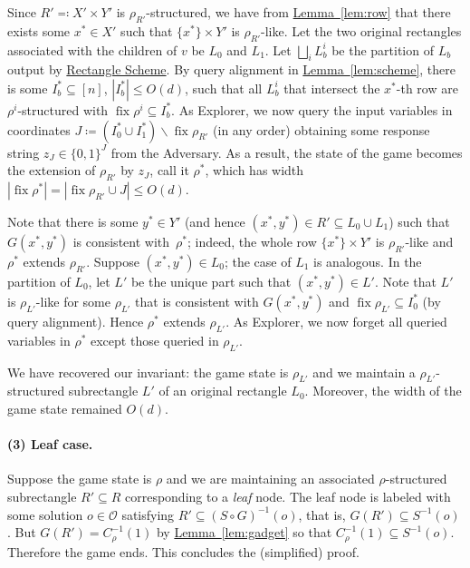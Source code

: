 \documentclass[11pt]{article}
\numberwithin{equation}{section}
\theoremstyle{definition}
\theoremstyle{plain}
\newcommand{\expref}[2]{\hyperref[#2]{#1~\ref{#2}}}
\newcommand{\rectlemma}{\expref{Lemma}{lem:scheme}\xspace}%
\newcommand{\rectscheme}{\hyperref[alg:partition]{Rectangle Scheme}\xspace}
\DeclareMathOperator{\fix}{fix}
\newcommand{\calO}{\mathcal{O}}
\begin{document}
Since $R' \eqqcolon X' \times Y'$ is $\rho_{R'}$-structured, we have from \expref{Lemma}{lem:row} that there exists some $x^*\in X'$ such that $\{x^*\}\times Y'$ is $\rho_{R'}$-like. Let the two original rectangles associated with the children of $v$ be $L_0$ and $L_1$. Let $\bigsqcup_i L_b^i$ be the partition of $L_b$ output by \rectscheme. By query alignment in \rectlemma, there is some $I_b^*\subseteq [n]$, $|I_b^*|\leq O(d)$, such that all $L_b^i$ that intersect the $x^*$-th row are $\rho^i$-structured with $\fix\rho^i\subseteq I_b^*$. As Explorer, we now query the input variables in coordinates $J\coloneqq (I_0^* \cup I_1^*) \smallsetminus \fix\rho_{R'}$ (in any order) obtaining some response string $z_J\in\{0,1\}^J$ from the Adversary. As a result, the state of the game becomes the extension of $\rho_{R'}$ by $z_J$, call it $\rho^*$, which has width $|\!\fix\rho^*|=|\!\fix\rho_{R'}\cup J|\leq O(d)$.

Note that there is some $y^*\in Y'$ (and hence $(x^*, y^*) \in R'\subseteq L_0\cup L_1$) such that $G(x^*,y^*)$ is consistent with~$\rho^*$; indeed, the whole row $\{x^*\}\times Y'$ is $\rho_{R'}$-like and $\rho^*$ extends $\rho_{R'}$. Suppose $(x^*, y^*) \in L_0$; the case of $L_1$ is analogous. In the partition of $L_0$, let $L'$ be the unique part such that $(x^*,y^*)\in L'$. Note that $L'$ is $\rho_{L'}$-like for some $\rho_{L'}$ that is consistent with $G(x^*,y^*)$ and $\fix\rho_{L'}\subseteq I_0^*$ (by query alignment). Hence $\rho^*$ extends $\rho_{L'}$. As Explorer, we now forget all queried variables in $\rho^*$ except those queried in $\rho_{L'}$.

We have recovered our invariant: the game state is $\rho_{L'}$ and we maintain a $\rho_{L'}$-structured subrectangle $L'$ of an original rectangle $L_0$. Moreover, the width of the game state remained $O(d)$.

\paragraph{(3) Leaf case.}
Suppose the game state is $\rho$ and we are maintaining an associated $\rho$-structured subrectangle $R'\subseteq R$ corresponding to a \emph{leaf} node. The leaf node is labeled with some solution $o\in \calO$ satisfying $R'\subseteq (S\circ G)^{-1}(o)$, that is, $G(R')\subseteq S^{-1}(o)$. But $G(R')=C_\rho^{-1}(1)$ by \expref{Lemma}{lem:gadget} so that $C_\rho^{-1}(1)\subseteq S^{-1}(o)$. Therefore the game ends. This concludes the (simplified) proof.
\end{document}
